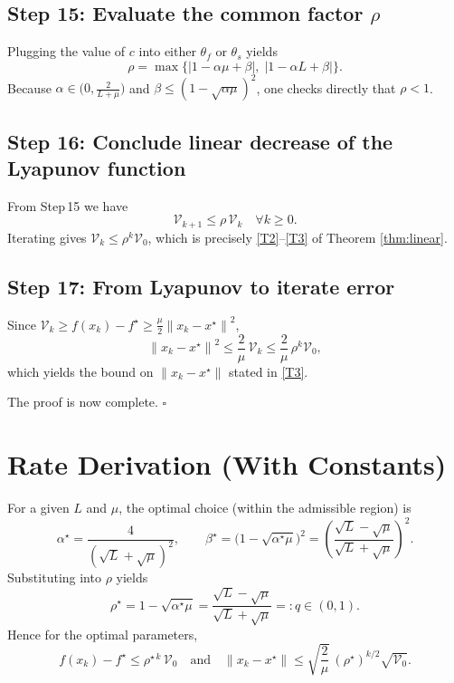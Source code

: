 \documentclass[11pt]{article}
\newcommand{\norm}[1]{\left\lVert#1\right\rVert}
\begin{document}
\subsection*{Step 15: Evaluate the common factor $\rho$}
Plugging the value of $c$ into either $\theta_{f}$ or $\theta_{s}$ yields
\[
\rho = \max\bigl\{|1-\alpha\mu+\beta|,\;|1-\alpha L+\beta|\bigr\}.
\tag{Step 15}
\]
Because $\alpha\in\bigl(0,\frac{2}{L+\mu}\bigr)$ and $\beta\le(1-\sqrt{\alpha\mu})^{2}$, one checks directly that $\rho<1$.

\subsection*{Step 16: Conclude linear decrease of the Lyapunov function}
From Step 15 we have
\[
\mathcal{V}_{k+1}\le\rho\,\mathcal{V}_{k}\quad\forall k\ge0.
\tag{Step 16}
\]
Iterating gives $\mathcal{V}_{k}\le\rho^{k}\mathcal{V}_{0}$, which is precisely \eqref{T2}–\eqref{T3} of Theorem \ref{thm:linear}.

\subsection*{Step 17: From Lyapunov to iterate error}
Since $\mathcal{V}_{k}\ge f(x_{k})-f^{\star}\ge\frac{\mu}{2}\norm{x_{k}-x^{\star}}^{2}$,
\[
\norm{x_{k}-x^{\star}}^{2}\le\frac{2}{\mu}\,\mathcal{V}_{k}
\le\frac{2}{\mu}\,\rho^{k}\mathcal{V}_{0},
\]
which yields the bound on $\norm{x_{k}-x^{\star}}$ stated in \eqref{T3}.

\noindent The proof is now complete. \hfill $\square$

\section*{Rate Derivation (With Constants)}
For a given $L$ and $\mu$, the optimal choice (within the admissible region) is
\[
\alpha^{\star}= \frac{4}{(\sqrt{L}+\sqrt{\mu})^{2}},\qquad
\beta^{\star}= \bigl(1-\sqrt{\alpha^{\star}\mu}\bigr)^{2}
            =\left(\frac{\sqrt{L}-\sqrt{\mu}}{\sqrt{L}+\sqrt{\mu}}\right)^{2}.
\]
Substituting into $\rho$ yields
\[
\rho^{\star}= 1-\sqrt{\alpha^{\star}\mu}
            = \frac{\sqrt{L}-\sqrt{\mu}}{\sqrt{L}+\sqrt{\mu}}
            =: q\in(0,1).
\]
Hence for the optimal parameters,
\[
f(x_{k})-f^{\star}\le \rho^{\star\,k}\,\mathcal{V}_{0}
\quad\text{and}\quad
\norm{x_{k}-x^{\star}}\le \sqrt{\frac{2}{\mu}}\,(\rho^{\star})^{k/2}\sqrt{\mathcal{V}_{0}}.
\]
\end{document}
